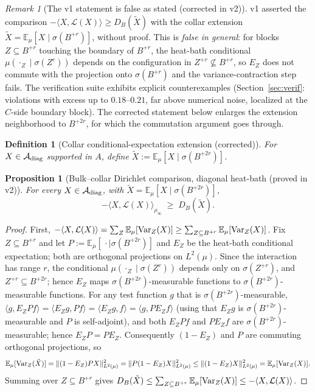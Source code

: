 \documentclass[11pt]{article}
\newtheorem{proposition}[theorem]{Proposition}
\newtheorem{definition}[theorem]{Definition}
\theoremstyle{remark}
\newtheorem{remark}[theorem]{Remark}
\begin{document}
\begin{remark}[The v1 statement is false as stated (corrected in v2)]
\label{rem:a4false}
v1 asserted the comparison $-\langle X, \mathcal{L}(X)\rangle \ge
D_B(\tilde X)$ with the collar extension $\tilde X = \mathbb{E}_\mu[X \mid
\sigma(B^{+r})]$, without proof. This is \emph{false in general}: for
blocks $Z \subseteq B^{+r}$ touching the boundary of $B^{+r}$, the
heat-bath conditional $\mu(\cdot_Z \mid \sigma(Z^c))$ depends on the
configuration in $Z^{+r} \not\subseteq B^{+r}$, so $E_Z$ does not commute
with the projection onto $\sigma(B^{+r})$ and the variance-contraction
step fails. The verification suite exhibits explicit counterexamples
(Section~\ref{sec:verif}: violations with excess up to $0.18$--$0.21$,
far above numerical noise, localized at the $C$-side boundary block). The
corrected statement below enlarges the extension neighborhood to
$B^{+2r}$, for which the commutation argument goes through.
\end{remark}

\begin{definition}[Collar conditional-expectation extension (corrected)]
For $X \in \mathcal{A}_{\rm diag}$ supported in $A$, define
$\tilde X := \mathbb{E}_\mu[X \mid \sigma(B^{+2r})]$.
\end{definition}

\begin{proposition}[Bulk--collar Dirichlet comparison, diagonal heat-bath
(proved in v2)]
\label{prop:diagcomp}
For every $X \in \mathcal{A}_{\rm diag}$,
with $\tilde X = \mathbb{E}_\mu[X \mid \sigma(B^{+2r})]$,
\[
-\langle X, \mathcal{L}(X)\rangle_{\rho_\infty} \;\ge\; D_B(\tilde X).
\]
\end{proposition}
\begin{proof}
First, $-\langle X,\mathcal{L}(X)\rangle = \sum_Z
\mathbb{E}_\mu[{\rm Var}_Z(X)] \ge \sum_{Z\subseteq B^{+r}}
\mathbb{E}_\mu[{\rm Var}_Z(X)]$. Fix $Z \subseteq B^{+r}$ and let
$P := \mathbb{E}_\mu[\,\cdot \mid \sigma(B^{+2r})]$ and $E_Z$ be the
heat-bath conditional expectation; both are orthogonal projections on
$L^2(\mu)$. Since the interaction has range $r$, the conditional
$\mu(\cdot_Z \mid \sigma(Z^c))$ depends only on $\sigma(Z^{+r})$, and
$Z^{+r} \subseteq B^{+2r}$; hence $E_Z$ maps
$\sigma(B^{+2r})$-measurable functions to $\sigma(B^{+2r})$-measurable
functions. For any test function $g$ that is $\sigma(B^{+2r})$-measurable,
$\langle g, E_Z P f\rangle = \langle E_Z g, P f\rangle =
\langle E_Z g, f\rangle = \langle g, P E_Z f\rangle$ (using that $E_Z g$
is $\sigma(B^{+2r})$-measurable and $P$ is self-adjoint), and both
$E_Z P f$ and $P E_Z f$ are $\sigma(B^{+2r})$-measurable; hence
$E_Z P = P E_Z$. Consequently $(1 - E_Z)$ and $P$ are commuting orthogonal
projections, so
\[
\mathbb{E}_\mu[{\rm Var}_Z(\tilde X)] = \|(1-E_Z)PX\|^2_{L^2(\mu)}
= \|P(1-E_Z)X\|^2_{L^2(\mu)} \le \|(1-E_Z)X\|^2_{L^2(\mu)}
= \mathbb{E}_\mu[{\rm Var}_Z(X)].
\]
Summing over $Z \subseteq B^{+r}$ gives
$D_B(\tilde X) \le \sum_{Z\subseteq B^{+r}}
\mathbb{E}_\mu[{\rm Var}_Z(X)] \le -\langle X,\mathcal{L}(X)\rangle$.
\end{proof}
\end{document}

